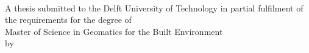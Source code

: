 \thispagestyle{empty}

\begin{titlepage}
  \begin{addmargin}[-1cm]{-3cm}
    \begin{center}  
        \hfill
        \vfill

        \begingroup
            \LARGE \color{newBlue}\spacedallcaps{\myTitle}\\
        \endgroup
        \vspace{0.5cm}
        \begingroup
        \large\mySubTitle
        \endgroup
        
        \vspace{5cm}
        
        A thesis submitted to the Delft University of Technology in partial fulfilment of the requirements for the degree of\\
        \vspace{2cm}
        Master of Science in Geomatics for the Built Environment\\
        \vspace{4cm}
        by\\
        \bigskip
        \myName\\
        \bigskip
        \myGraduationMonth\xspace\myGraduationYear\\

        \vfill

    \end{center}  
  \end{addmargin}       
\end{titlepage}  

